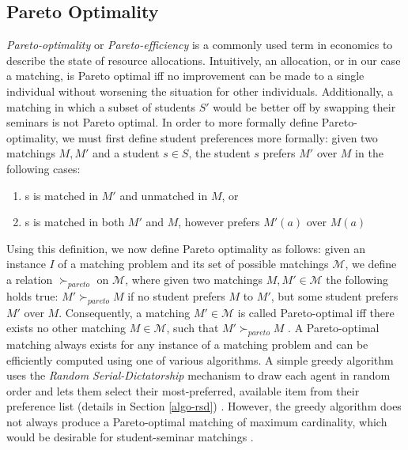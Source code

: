 \subsection{Pareto Optimality}
\emph{Pareto-optimality} or \emph{Pareto-efficiency} is a commonly used term in economics to describe the state of resource allocations. Intuitively, an allocation, or in our case a matching, is Pareto optimal iff no improvement can be made to a single individual without worsening the situation for other individuals. Additionally, a matching in which a subset of students $S'$ would be better off by swapping their seminars is not Pareto optimal.
In order to more formally define Pareto-optimality, we must first define student preferences more formally: 
given two matchings $M, M'$ and a student $s \in S$, the student $s$ prefers $M'$ over $M$ in the following cases:
\begin{enumerate}
    \item s is matched in $M'$ and unmatched in $M$, or
    \item s is matched in both $M'$ and $M$, however prefers $M'(a)$ over $M(a)$
\end{enumerate}
Using this definition, we now define Pareto optimality as follows: given an instance $I$ of a matching problem and its set of possible matchings $\mathcal{M}$, we define a relation $\succ_{pareto}$ on $\mathcal{M}$, where given two matchings $M, M' \in \mathcal{M}$ the following holds true: $M' \succ_{pareto} M$ if no student prefers $M$ to $M'$, but some student prefers $M'$ over $M$. Consequently, a matching $M' \in \mathcal{M}$ is called Pareto-optimal iff there exists no other matching $M \in \mathcal{M}$, such that $M' \succ_{pareto} M$ \cite{algorithmics}. A Pareto-optimal matching always exists for any instance of a matching problem and can be efficiently computed using one of various algorithms. A simple greedy algorithm uses the \emph{Random Serial-Dictatorship} mechanism to draw each agent in random order and lets them select their most-preferred, available item from their preference list (details in Section \ref{algo-rsd}) \cite{RothTwoSided, SerialDictatorship}. However, the greedy algorithm does not always produce a Pareto-optimal matching of maximum cardinality, which would be desirable for student-seminar matchings \cite{Abraham:Pacha}.

